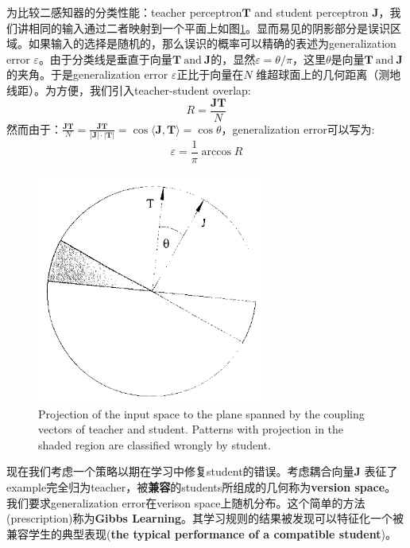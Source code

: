 \documentclass[11pt,fleqn, UTF8]{ctexbook} %
\begin{document}
\begin{subappendices}
为比较二感知器的分类性能：teacher perceptron$\boldsymbol{T}$ and student perceptron $\boldsymbol{J}$，我们讲相同的输入通过二者映射到一个平面上如图\ref{fig:app2}。显而易见的阴影部分是误识区域。如果输入的选择是随机的，那么误识的概率可以精确的表述为generalization error $\varepsilon$。由于分类线是垂直于向量$\boldsymbol{T}~\text{and}~\boldsymbol{J}$的，显然$\varepsilon=\theta/\pi$，这里$\theta$是向量$\boldsymbol{T}~\text{and}~\boldsymbol{J}$的夹角。于是generalization error $\varepsilon$正比于向量在$N$ 维超球面上的几何距离（测地线距）。为方便，我们引入teacher-student overlap:
\begin{equation*}
  R=\frac{\boldsymbol{JT}}{N}
\end{equation*}
然而由于：$\frac{\boldsymbol{JT}}{N}=\frac{\boldsymbol{JT}}{|\boldsymbol{J}|\cdot|\boldsymbol{T}|}=\cos\langle\boldsymbol{J},\boldsymbol{T}\rangle=\cos\theta$，generalization error可以写为:
\begin{equation*}
  \varepsilon=\frac{1}{\pi}\arccos R
\end{equation*}
\begin{figure}[t]
 \centering
 \includegraphics{pics/app2.png}
 \caption{Projection of the input space to the plane spanned by the coupling vectors of teacher and student. Patterns with projection in the shaded region are classified wrongly by student.}
 \label{fig:app2}
\end{figure}

现在我们考虑一个策略以期在学习中修复student的错误。考虑耦合向量$\boldsymbol{J}$ 表征了example完全归为teacher，被\textbf{兼容}的students所组成的几何称为\textbf{version space}。 我们要求generalization error在verison space上随机分布。这个简单的方法(prescription)称为\textbf{Gibbs Learning}。其学习规则的结果被发现可以特征化一个被兼容学生的典型表现(\textbf{the typical performance of a compatible student})。


\end{subappendices}
\end{document}
